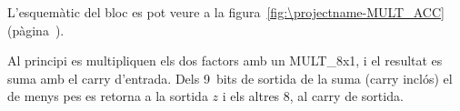 L'esquemàtic del bloc es pot veure a la figura~\ref{fig:\projectname-MULT_ACC} (pàgina~\pageref{fig:\projectname-MULT_ACC}).

Al principi es multipliquen els dos factors amb un \textsf{MULT\_8x1}, i el
resultat es suma amb el carry d'entrada. Dels 9~bits de sortida de la suma (carry
inclós) el de menys pes es retorna a la sortida $z$ i els altres 8, al carry de
sortida.

\vspace{1cm}
